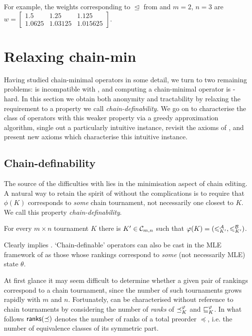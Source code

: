For example, the weights corresponding to $\trianglelefteq$ from
 and $m = 2$, $n = 3$ are
$
    w = \left[\begin{smallmatrix}
        1.5 & 1.25 & 1.125 \\
        1.0625 & 1.03125 & 1.015625
    \end{smallmatrix}\right]
$.

\section{Relaxing chain-min}
\label{tourn_sec_relaxing_chain_min}

Having studied chain-minimal operators in some detail, we turn to two remaining
problems: \chainmin{} is incompatible with \anon{}, and
computing a chain-minimal operator is -hard. In this
section we obtain both anonymity and tractability by relaxing the
\chainmin{} requirement to a property we call
\emph{chain-definability}. We go on to characterise the class of operators with
this weaker property via a greedy approximation algorithm, single out a
particularly intuitive instance, revisit the axioms of
, and present new axioms which characterise
this intuitive instance.

\subsection{Chain-definability}

The source of the difficulties with \chainmin{} lies in the
minimisation aspect of chain editing. A natural way to retain the spirit of
\chainmin{} without the complications is to require that $\phi(K)$
corresponds to \emph{some} chain tournament, not necessarily one closest to
$K$. We call this property \emph{chain-definability}.

\begin{axiom}[\chaindef{}]
    For every $m \times n$ tournament $K$ there is $K' \in \mathcal{C}_{m,n}$ such that
    $\varphi(K) = ({\leqslant^{\mathcal{A}}_{K'}}, {\leqslant^{\mathcal{B}}_{K'}})$.
\end{axiom}

Clearly \chainmin{} implies \chaindef{}. `Chain-definable'
operators can also be cast in the MLE framework of  as those
whose rankings correspond to \emph{some} (not necessarily MLE) state $\theta$.

At first glance it may seem difficult to determine whether a given pair of
rankings correspond to a chain tournament, since the number of such tournaments
grows rapidly with $m$ and $n$.
%
Fortunately, \chaindef{} can be characterised without reference to
chain tournaments by considering the number of \emph{ranks} of ${\preceq_K^\varphi}$
and ${\sqsubseteq_K^\varphi}$. In what follows $\mathsf{ranks}({\preceq})$ denotes the number of
ranks of a total preorder $\preceq$, i.e. the number of equivalence classes of
its symmetric part.

